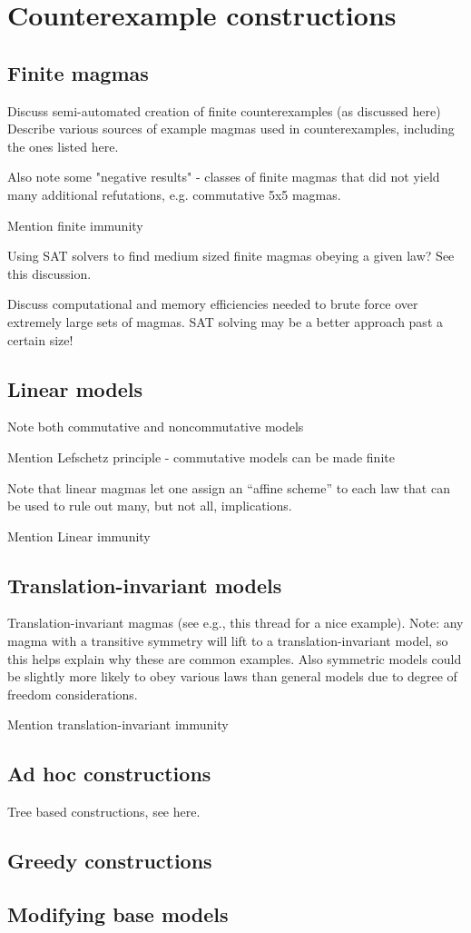 
\section{Counterexample constructions}


\subsection{Finite magmas}\label{finite-sec}

Discuss semi-automated creation of finite counterexamples (as discussed here)
Describe various sources of example magmas used in counterexamples, including the ones listed here.

Also note some "negative results" - classes of finite magmas that did not yield many additional refutations, e.g. commutative 5x5 magmas.

Mention finite immunity

Using SAT solvers to find medium sized finite magmas obeying a given law? See this discussion.

Discuss computational and memory efficiencies needed to brute force over extremely large sets of magmas. SAT solving may be a better approach past a certain size!

\subsection{Linear models}\label{linear-sec}

Note both commutative and noncommutative models

Mention Lefschetz principle - commutative models can be made finite

Note that linear magmas let one assign an ``affine scheme'' to each law that can be used to rule out many, but not all, implications.

Mention Linear immunity



\subsection{Translation-invariant models}\label{translation-sec}

Translation-invariant magmas (see e.g., this thread for a nice example). Note: any magma with a transitive symmetry will lift to a translation-invariant model, so this helps explain why these are common examples. Also symmetric models could be slightly more likely to obey various laws than general models due to degree of freedom considerations.

Mention translation-invariant immunity

\subsection{Ad hoc constructions}\label{adhoc-sec}

Tree based constructions, see here.

\subsection{Greedy constructions}\label{greedy-sec}


\subsection{Modifying base models}\label{modify-base}
